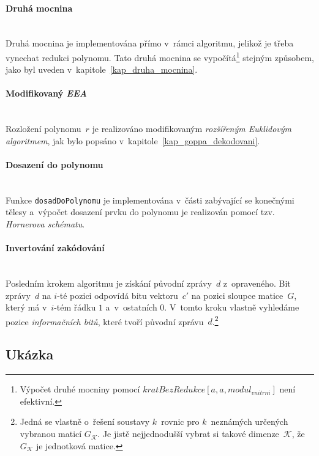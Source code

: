\documentclass[thesis=M,czech,hidelinks]{FITthesis}[2012/06/26]
\newcommand{\0}{{\textcolor[gray]{0.75}{0}}}
\begin{document}
\vfill


\paragraph{Druhá mocnina} \hfil \\
Druhá mocnina je implementována přímo v~rámci algoritmu, jelikož je třeba
vynechat redukci polynomu. Tato druhá mocnina se vypočítá\footnote{
    Výpočet druhé mocniny pomocí $ kratBezRedukce[ a, a, modul_{vnitrni} ] $ není
    efektivní.
} stejným způsobem, jako byl uveden v~kapitole~\ref{kap_druha_mocnina}.


\paragraph{Modifikovaný \emph{EEA}} \hfil \\
Rozložení polynomu~$r$ je realizováno modifikovaným \emph{rozšířeným Euklidovým
algoritmem}, jak bylo popsáno v~kapitole~\ref{kap_goppa_dekodovani}.


\paragraph{Dosazení do polynomu} \hfil \\
Funkce \texttt{dosadDoPolynomu} je implementována v~části zabývající se
konečnými tělesy a~výpočet dosazení prvku do polynomu je realizován pomocí tzv.
\emph{Hornerova schématu}.


\paragraph{Invertování zakódování} \hfil \\
Posledním krokem algoritmu je získání původní zprávy~$d$ z~opraveného.
Bit zprávy~$d$ na $i$-té pozici odpovídá bitu vektoru~$c'$ na pozici sloupce
matice~$G$, který má v~$i$-tém řádku $1$ a~v~ostatních $0$. V~tomto kroku
vlastně vyhledáme pozice \emph{informačních bitů}, které tvoří původní
zprávu~$d$.\footnote{
    Jedná se vlastně o~řešení soustavy $k$~rovnic pro $k$~neznámých určených
    vybranou maticí $G_\mathcal{K}$. Je jistě nejjednodušší vybrat si takové
    dimenze~$\mathcal{K}$, že~$G_\mathcal{K}$ je jednotková matice.
}

\vfil

\subsection{Ukázka}\label{kap_goppa_ukazka}
\end{document}

